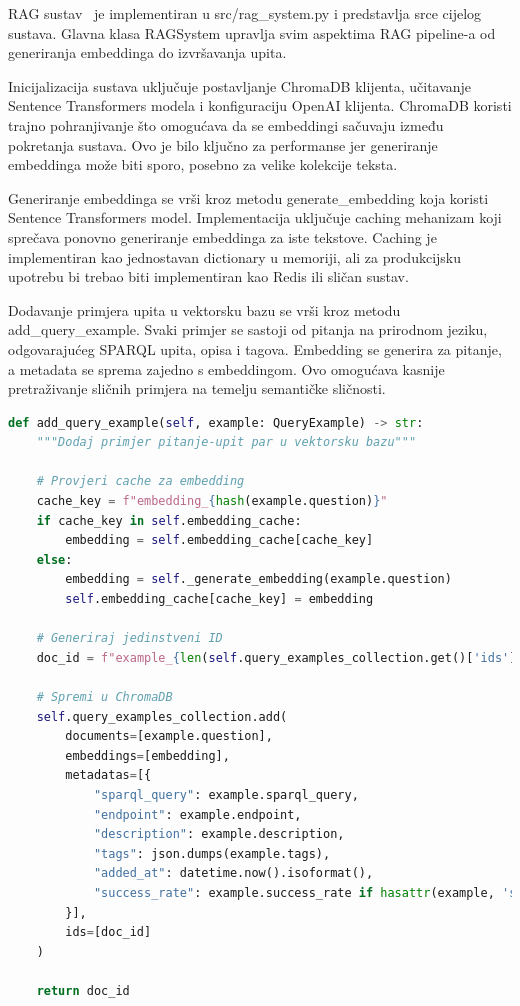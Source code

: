 RAG sustav~\cite{lewis2020retrieval} je implementiran u src/rag\_system.py i predstavlja srce cijelog sustava. Glavna klasa RAGSystem upravlja svim aspektima RAG pipeline-a od generiranja embeddinga do izvršavanja upita.

Inicijalizacija sustava uključuje postavljanje ChromaDB klijenta, učitavanje Sentence Transformers modela i konfiguraciju OpenAI klijenta. ChromaDB koristi trajno pohranjivanje što omogućava da se embeddingi sačuvaju između pokretanja sustava. Ovo je bilo ključno za performanse jer generiranje embeddinga može biti sporo, posebno za velike kolekcije teksta.

Generiranje embeddinga se vrši kroz metodu generate\_embedding koja koristi Sentence Transformers model. Implementacija uključuje caching mehanizam koji sprečava ponovno generiranje embeddinga za iste tekstove. Caching je implementiran kao jednostavan dictionary u memoriji, ali za produkcijsku upotrebu bi trebao biti implementiran kao Redis ili sličan sustav.

Dodavanje primjera upita u vektorsku bazu se vrši kroz metodu add\_query\_example. Svaki primjer se sastoji od pitanja na prirodnom jeziku, odgovarajućeg SPARQL upita, opisa i tagova. Embedding se generira za pitanje, a metadata se sprema zajedno s embeddingom. Ovo omogućava kasnije pretraživanje sličnih primjera na temelju semantičke sličnosti.

\begin{lstlisting}[language=Python, caption=Implementacija dodavanja primjera u vektorsku bazu]
def add_query_example(self, example: QueryExample) -> str:
    """Dodaj primjer pitanje-upit par u vektorsku bazu"""
    
    # Provjeri cache za embedding
    cache_key = f"embedding_{hash(example.question)}"
    if cache_key in self.embedding_cache:
        embedding = self.embedding_cache[cache_key]
    else:
        embedding = self._generate_embedding(example.question)
        self.embedding_cache[cache_key] = embedding
    
    # Generiraj jedinstveni ID
    doc_id = f"example_{len(self.query_examples_collection.get()['ids'])}"
    
    # Spremi u ChromaDB
    self.query_examples_collection.add(
        documents=[example.question],
        embeddings=[embedding],
        metadatas=[{
            "sparql_query": example.sparql_query,
            "endpoint": example.endpoint,
            "description": example.description,
            "tags": json.dumps(example.tags),
            "added_at": datetime.now().isoformat(),
            "success_rate": example.success_rate if hasattr(example, 'success_rate') else None
        }],
        ids=[doc_id]
    )
    
    return doc_id
\end{lstlisting}

